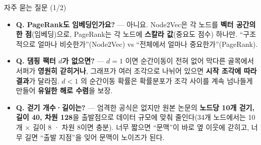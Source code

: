 \begin{frame}{자주 묻는 질문 (1/2)}
  \small
  \begin{itemize}
    \item \textbf{Q. PageRank도 임베딩인가요?} --- 아니요.
      Node2Vec은 각 노드를 \textbf{벡터 공간의 한 점}(임베딩)으로,
      PageRank는 각 노드에 \textbf{스칼라 값}(중요도 점수) 하나만.
      ``구조적으로 얼마나 비슷한가''(Node2Vec) vs ``전체에서 얼마나
      중요한가''(PageRank).
    \item \textbf{Q. 댐핑 팩터 $d$가 없으면?} --- $d{=}1$ 이면
      순간이동이 전혀 없어 막다른 골목에서 서퍼가 \textbf{영원히
      갇히거나}, 그래프가 여러 조각으로 나뉘어 있으면 \textbf{시작
      조각에 따라 결과}가 달라짐. $d{<}1$ 의 순간이동 확률은
      확률분포가 조각 사이를 계속 넘나들게 만들어 \textbf{유일한
      해로 수렴}을 보장.
    \item \textbf{Q. 걷기 개수·길이는?} --- 엄격한 공식은 없지만
      원본 논문의 \textbf{노드당 10개 걷기, 길이 40, 차원 128}을
      출발점으로 데이터 규모에 맞춰 줄인다(34개 노드에서는
      10개 $\times$ 길이 8 · 차원 8이면 충분). 너무 짧으면
      ``문맥''이 바로 옆 이웃에 갇히고, 너무 길면 ``출발 지점''을
      잊어 문맥이 노이즈가 된다.
  \end{itemize}
\end{frame}

